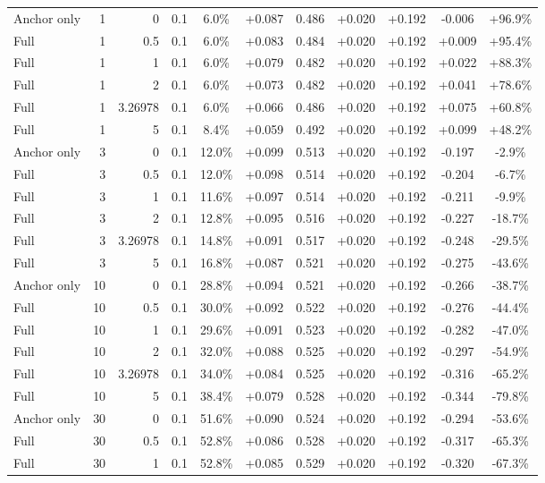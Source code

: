 \begin{table}[htbp]
\begin{tabular}{lrrrccccccc}
Anchor only & 1 & 0 & 0.1 & 6.0\% & +0.087 & 0.486 & +0.020 & +0.192 & -0.006 & +96.9\% \\
Full & 1 & 0.5 & 0.1 & 6.0\% & +0.083 & 0.484 & +0.020 & +0.192 & +0.009 & +95.4\% \\
Full & 1 & 1 & 0.1 & 6.0\% & +0.079 & 0.482 & +0.020 & +0.192 & +0.022 & +88.3\% \\
Full & 1 & 2 & 0.1 & 6.0\% & +0.073 & 0.482 & +0.020 & +0.192 & +0.041 & +78.6\% \\
Full & 1 & 3.26978 & 0.1 & 6.0\% & +0.066 & 0.486 & +0.020 & +0.192 & +0.075 & +60.8\% \\
Full & 1 & 5 & 0.1 & 8.4\% & +0.059 & 0.492 & +0.020 & +0.192 & +0.099 & +48.2\% \\
Anchor only & 3 & 0 & 0.1 & 12.0\% & +0.099 & 0.513 & +0.020 & +0.192 & -0.197 & -2.9\% \\
Full & 3 & 0.5 & 0.1 & 12.0\% & +0.098 & 0.514 & +0.020 & +0.192 & -0.204 & -6.7\% \\
Full & 3 & 1 & 0.1 & 11.6\% & +0.097 & 0.514 & +0.020 & +0.192 & -0.211 & -9.9\% \\
Full & 3 & 2 & 0.1 & 12.8\% & +0.095 & 0.516 & +0.020 & +0.192 & -0.227 & -18.7\% \\
Full & 3 & 3.26978 & 0.1 & 14.8\% & +0.091 & 0.517 & +0.020 & +0.192 & -0.248 & -29.5\% \\
Full & 3 & 5 & 0.1 & 16.8\% & +0.087 & 0.521 & +0.020 & +0.192 & -0.275 & -43.6\% \\
Anchor only & 10 & 0 & 0.1 & 28.8\% & +0.094 & 0.521 & +0.020 & +0.192 & -0.266 & -38.7\% \\
Full & 10 & 0.5 & 0.1 & 30.0\% & +0.092 & 0.522 & +0.020 & +0.192 & -0.276 & -44.4\% \\
Full & 10 & 1 & 0.1 & 29.6\% & +0.091 & 0.523 & +0.020 & +0.192 & -0.282 & -47.0\% \\
Full & 10 & 2 & 0.1 & 32.0\% & +0.088 & 0.525 & +0.020 & +0.192 & -0.297 & -54.9\% \\
Full & 10 & 3.26978 & 0.1 & 34.0\% & +0.084 & 0.525 & +0.020 & +0.192 & -0.316 & -65.2\% \\
Full & 10 & 5 & 0.1 & 38.4\% & +0.079 & 0.528 & +0.020 & +0.192 & -0.344 & -79.8\% \\
Anchor only & 30 & 0 & 0.1 & 51.6\% & +0.090 & 0.524 & +0.020 & +0.192 & -0.294 & -53.6\% \\
Full & 30 & 0.5 & 0.1 & 52.8\% & +0.086 & 0.528 & +0.020 & +0.192 & -0.317 & -65.3\% \\
Full & 30 & 1 & 0.1 & 52.8\% & +0.085 & 0.529 & +0.020 & +0.192 & -0.320 & -67.3\% \\

\end{tabular}
\end{table}
